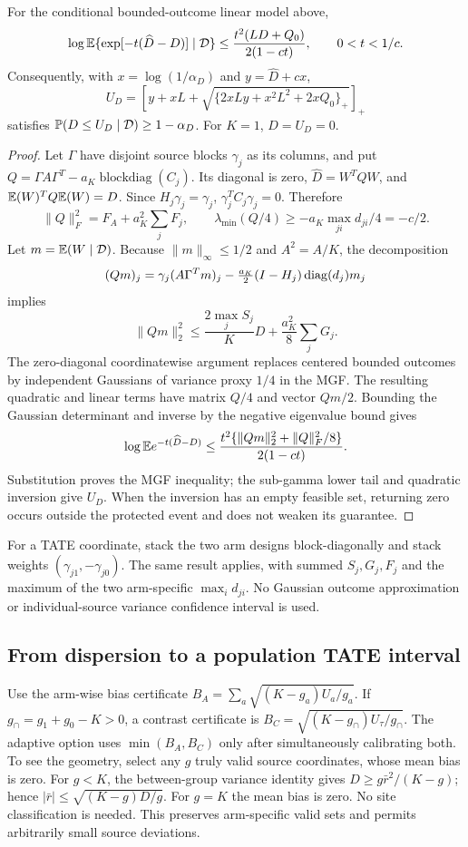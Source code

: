 \begin{proposition}
For the conditional bounded-outcome linear model above,
\[
 \log\mathbb E\{\exp[-t(\widehat D-D)]\mid\mathcal D\}
 \le\frac{t^2(LD+Q_0)}{2(1-ct)},\qquad 0<t<1/c.
\]
Consequently, with $x=\log(1/\alpha_D)$ and $y=\widehat D+cx$,
\[
 U_D=\left[y+xL+\sqrt{\{2xLy+x^2L^2+2xQ_0\}_+}\right]_+
\]
satisfies $\mathbb P(D\le U_D\mid\mathcal D)\ge1-\alpha_D$.
For $K=1$, $D=U_D=0$.
\end{proposition}
\begin{proof}
Let $\Gamma$ have disjoint source blocks $\gamma_j$ as its columns, and put
$Q=\Gamma A\Gamma^T-a_K\operatorname{blockdiag}(C_j)$. Its diagonal is zero,
$\widehat D=W^TQW$, and $\mathbb E(W)^TQ\mathbb E(W)=D$. Since $H_j\gamma_j=\gamma_j$,
$\gamma_j^TC_j\gamma_j=0$. Therefore
\[
 \|Q\|_F^2=F_A+a_K^2\sum_jF_j,\qquad
 \lambda_{\min}(Q/4)\ge-a_K\max_{ji}d_{ji}/4=-c/2.
\]
Let $m=\mathbb E(W\mid\mathcal D)$. Because $\|m\|_\infty\le1/2$ and
$A^2=A/K$, the decomposition
\[
 (Qm)_j=\gamma_j(A\Gamma^Tm)_j
       -\tfrac{a_K}2(I-H_j)\operatorname{diag}(d_j)m_j
\]
implies
\[
 \|Qm\|_2^2\le \frac{2\max_jS_j}{K}D+\frac{a_K^2}{8}\sum_jG_j.
\]
The zero-diagonal coordinatewise argument replaces centered bounded outcomes
by independent Gaussians of variance proxy $1/4$ in the MGF. The resulting
quadratic and linear terms have matrix $Q/4$ and vector $Qm/2$. Bounding the
Gaussian determinant and inverse by the negative eigenvalue bound gives
\[
 \log\mathbb E e^{-t(\widehat D-D)}
 \le\frac{t^2\{\|Qm\|_2^2+\|Q\|_F^2/8\}}{2(1-ct)}.
\]
Substitution proves the MGF inequality; the sub-gamma lower tail and quadratic
inversion give $U_D$. When the inversion has an empty feasible set, returning
zero occurs outside the protected event and does not weaken its guarantee.
\end{proof}

For a TATE coordinate, stack the two arm designs block-diagonally and stack
weights $(\gamma_{j1},-\gamma_{j0})$. The same result applies, with summed
$S_j,G_j,F_j$ and the maximum of the two arm-specific $\max_i d_{ji}$.
No Gaussian outcome approximation or individual-source variance confidence
interval is used.

\subsection{From dispersion to a population TATE interval}

Use the arm-wise bias certificate
$B_A=\sum_a\sqrt{(K-g_a)U_a/g_a}$. If $g_\cap=g_1+g_0-K>0$, a contrast
certificate is $B_C=\sqrt{(K-g_\cap)U_\tau/g_\cap}$. The adaptive option
uses $\min(B_A,B_C)$ only after simultaneously calibrating both. To see the
geometry, select any $g$ truly valid source coordinates, whose mean bias is
zero. For $g<K$, the between-group variance identity gives
$D\ge g\bar r^2/(K-g)$; hence $|\bar r|\le\sqrt{(K-g)D/g}$.
For $g=K$ the mean bias is zero. No site classification is needed. This preserves
arm-specific valid sets and permits arbitrarily small source deviations.


